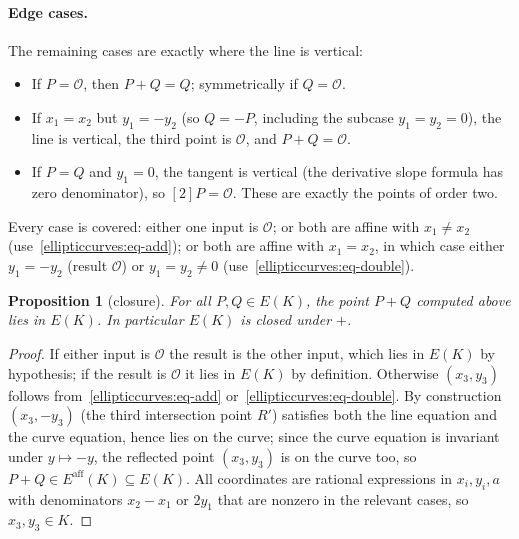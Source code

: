 \documentclass[11pt,a4paper]{article}
\newtheorem{proposition}[theorem]{Proposition}
\theoremstyle{definition}
\theoremstyle{remark}
\begin{document}
\paragraph{Edge cases.} The remaining cases are exactly where the line is vertical:
\begin{itemize}
  \item If \(P = \mathcal{O}\), then \(P + Q = Q\); symmetrically if \(Q = \mathcal{O}\).
  \item If \(x_1 = x_2\) but \(y_1 = -y_2\) (so \(Q = -P\), including the subcase \(y_1 = y_2 = 0\)), the line is vertical, the third point is \(\mathcal{O}\), and \(P + Q = \mathcal{O}\).
  \item If \(P = Q\) and \(y_1 = 0\), the tangent is vertical (the derivative slope formula has zero denominator), so \([2]P = \mathcal{O}\). These are exactly the points of order two.
\end{itemize}
Every case is covered: either one input is \(\mathcal{O}\); or both are affine with \(x_1 \neq x_2\) (use~\eqref{ellipticcurves:eq-add}); or both are affine with \(x_1 = x_2\), in which case either \(y_1 = -y_2\) (result \(\mathcal{O}\)) or \(y_1 = y_2 \neq 0\) (use~\eqref{ellipticcurves:eq-double}).

\begin{proposition}[closure]\label{ellipticcurves:prop-closure}
For all \(P, Q \in E(K)\), the point \(P + Q\) computed above lies in \(E(K)\). In particular \(E(K)\) is closed under \(+\).
\end{proposition}

\begin{proof}
If either input is \(\mathcal{O}\) the result is the other input, which lies in \(E(K)\) by hypothesis; if the result is \(\mathcal{O}\) it lies in \(E(K)\) by definition. Otherwise \((x_3, y_3)\) follows from~\eqref{ellipticcurves:eq-add} or~\eqref{ellipticcurves:eq-double}. By construction \((x_3, -y_3)\) (the third intersection point \(R'\)) satisfies both the line equation and the curve equation, hence lies on the curve; since the curve equation is invariant under \(y \mapsto -y\), the reflected point \((x_3, y_3)\) is on the curve too, so \(P+Q \in E^{\mathrm{aff}}(K) \subseteq E(K)\). All coordinates are rational expressions in \(x_i, y_i, a\) with denominators \(x_2 - x_1\) or \(2y_1\) that are nonzero in the relevant cases, so \(x_3, y_3 \in K\).
\end{proof}
\end{document}
